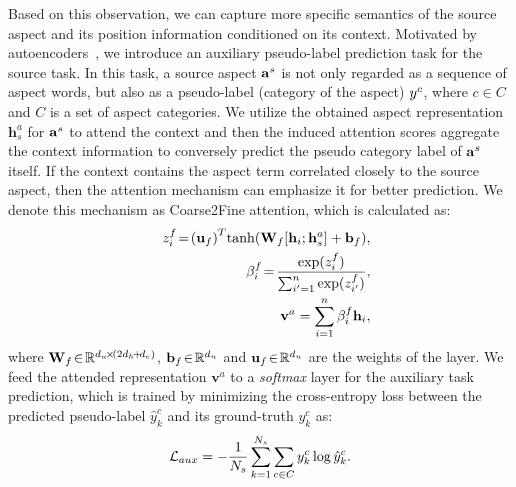 \documentclass[letterpaper]{article} \usepackage{aaai19}  \usepackage{times}  \usepackage{latexsym}
\begin{document}
Based on this observation, we can capture more specific semantics of the source aspect and its position information conditioned on its context. Motivated by autoencoders~\cite{bengio2007greedy}, we introduce an auxiliary pseudo-label prediction task for the source task. In this task, a source aspect $\small{\mathbf{a}^s}$ is not only regarded as a sequence of aspect words, but also as a pseudo-label (category of the aspect) $\small{{y}^c}$, where $c \in C$ and $C$ is a set of aspect categories. We utilize the obtained aspect representation ${ \mathbf{h} }^{ a }_{s}$ for $\small{\mathbf{a}^s}$ to attend the context and then the induced attention scores aggregate the context information to conversely predict the pseudo category label of $\small{\mathbf{a}^s}$ itself. If the context contains the aspect term correlated closely to the source aspect, then the attention mechanism can emphasize it for better prediction. We denote this mechanism as Coarse2Fine attention, which is calculated as:
\begin{eqnarray}
&&\small{{ z }_{ i }^{ f }\!=\!{ ({ \mathbf{u} }_f) }^{ T }\mathrm{tanh}({ { { { { \mathbf{W} } } } }_f }[{ \mathbf{h} }_{ i };{ { { \mathbf{h} } }^{ a  }_{s} }]+{ { \mathbf{b} } }_{ f })},\\ 
&&\small{{ \beta   }_{ i }^{ f }\!=\!\frac { {\exp}({ z }_{i }^{ f }) }{ \sum _{ i'=1 }^{ n }{ {\exp}({ z }_{i'}^{ f }) }  }},\\
&&{ \mathbf{v} }^{ a }=\sum _{ i=1 }^{ n }{ { \beta   }_{ i }^{ f }{ \mathbf{h} }_{ i } } ,
\end{eqnarray}
where $\small{{ \mathbf{W} }_{ f }\!\in\! { \mathbb{R} }^{ { d }_{ u }\!\times\! (2{ d }_{ h }\!+\!{ d }_{ e }) }}$, $\small{{ \mathbf{b} }_{ f } \!\in\! { \mathbb{R} }^{ { d }_{ u } }}$ and $\small{{ \mathbf{u} }_{ f } \!\in\! { \mathbb{R} }^{ { d }_{ u } }}$ are the weights of the layer. We feed the attended representation ${ \mathbf{v} }^{ a }$ to a {\it softmax} layer for the auxiliary task prediction, which is trained by minimizing the cross-entropy loss between the predicted pseudo-label $\hat{ y }^{c}_{ k }$ and its ground-truth ${  { y }  }^{c}_{ k }$ as:
\begin{equation}
\small{\mathcal{L}_{aux}=-\frac { 1 }{ { N }_{ s }} \sum _{ k=1 }^{ { N }_{ s } } \sum _{ c\in C }{ {  { y }  }^{c}_{ k }\log \hat{ y }^{c}_{ k } }.}
\end{equation}
\end{document}
